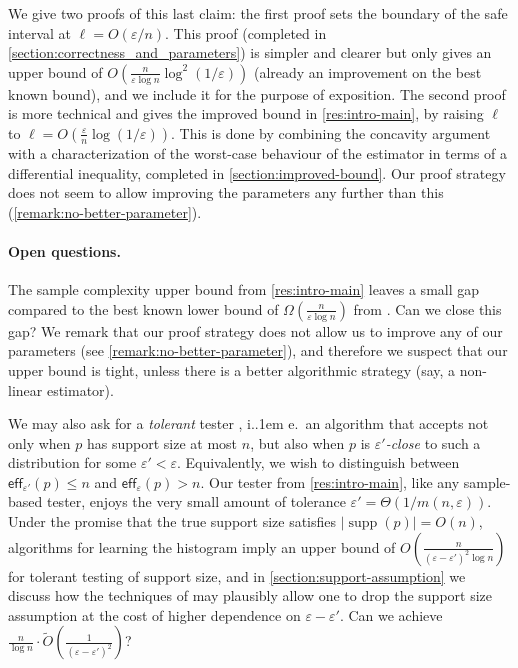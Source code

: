 \documentclass[10pt,a4paper]{article}
\newcommand*\ie{i.\kern.1em e.\ }
\DeclareMathOperator{\supp}{supp}   %
\newcommand{\eff}{\mathsf{eff}}
\renewcommand{\epsilon}{\varepsilon}
\begin{document}
{We give two proofs of this last claim: the first proof sets the boundary of the safe interval at
$\ell = O(\epsilon/n)$. This proof (completed in \cref{section:correctness_and_parameters}) is
simpler and clearer but only gives an upper bound of $O(\tfrac{n}{\epsilon \log
n}\log^2(1/\epsilon))$ (already an improvement on the best known bound), and we include it for the
purpose of exposition. The second proof is more technical and gives the improved bound in
\cref{res:intro-main}, by raising $\ell$ to $\ell = O(\tfrac{\epsilon}{n}\log(1/\epsilon))$. This is
done by combining the concavity argument with a characterization of the worst-case behaviour of the
estimator in terms of a differential inequality, completed in \cref{section:improved-bound}. Our
proof strategy does not seem to allow improving the parameters any further than this
(\cref{remark:no-better-parameter}).
}

\paragraph*{Open questions.}

The sample complexity upper bound from \cref{res:intro-main} leaves a small gap compared to the best
known lower bound of $\Omega(\tfrac{n}{\epsilon \log n})$ from \cite{VV11stoc,WY19}. Can we close
this gap? We remark that our proof strategy does not allow us to improve any of our parameters (see
\cref{remark:no-better-parameter}), and therefore we suspect that our upper bound is tight, unless
there is a better algorithmic strategy (say, a non-linear estimator).

We may also ask for a \emph{tolerant} tester \cite{PRR06}, \ie an algorithm that accepts not only
when $p$ has support size at most $n$, but also when $p$ is \emph{$\epsilon'$-close} to such a
distribution for some $\epsilon' < \epsilon$. Equivalently, we wish to distinguish between
$\eff_{\epsilon'}(p) \le n$ and $\eff_\epsilon(p) > n$. Our tester from \cref{res:intro-main}, like
any sample-based tester, enjoys the very small amount of tolerance $\epsilon' = \Theta(1 /
m(n,\epsilon))$. Under the promise that the true support size satisfies $|\supp(p)| = O(n)$,
algorithms for learning the histogram \cite{VV11stoc,VV17,HJW18,HO19pml} imply an upper bound of
$O\left(\tfrac{n}{(\epsilon-\epsilon')^2 \log n}\right)$ for tolerant testing of support size, and
in \cref{section:support-assumption} we discuss how the techniques of \cite{VV16} may plausibly
allow one to drop the support size assumption at the cost of higher dependence on
$\epsilon-\epsilon'$. Can we achieve $\tfrac{n}{\log n} \cdot \widetilde
O\left(\tfrac{1}{(\epsilon-\epsilon')^2}\right)$?
\end{document}
